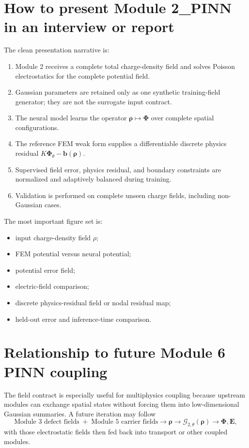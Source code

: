 \documentclass[11pt]{article}
\newcommand{\Evec}{\mathbf{E}}
\begin{document}
\section{How to present Module 2\_PINN in an interview or report}

The clean presentation narrative is:
\begin{enumerate}[leftmargin=2em]
    \item Module 2 receives a complete total charge-density field and solves Poisson electrostatics for the complete potential field.
    \item Gaussian parameters are retained only as one synthetic training-field generator; they are not the surrogate input contract.
    \item The neural model learns the operator $\bm{\rho}\mapsto\bm{\Phi}$ over complete spatial configurations.
    \item The reference FEM weak form supplies a differentiable discrete physics residual $K\bm{\Phi}_{\theta}-\bm{b}(\bm{\rho})$.
    \item Supervised field error, physics residual, and boundary constraints are normalized and adaptively balanced during training.
    \item Validation is performed on complete unseen charge fields, including non-Gaussian cases.
\end{enumerate}

The most important figure set is:
\begin{itemize}[leftmargin=2em]
    \item input charge-density field $\rho$;
    \item FEM potential versus neural potential;
    \item potential error field;
    \item electric-field comparison;
    \item discrete physics-residual field or nodal residual map;
    \item held-out error and inference-time comparison.
\end{itemize}

\section{Relationship to future Module 6 PINN coupling}

The field contract is especially useful for multiphysics coupling because upstream modules can exchange spatial states without forcing them into low-dimensional Gaussian summaries. A future iteration may follow
\begin{equation}
\text{Module 3 defect fields}
\; + \;
\text{Module 5 carrier fields}
\longrightarrow
\bm{\rho}
\longrightarrow
\mathcal{G}_{2,\theta}(\bm{\rho})
\longrightarrow
\bm{\Phi},\Evec,
\end{equation}
with those electrostatic fields then fed back into transport or other coupled modules.
\end{document}
